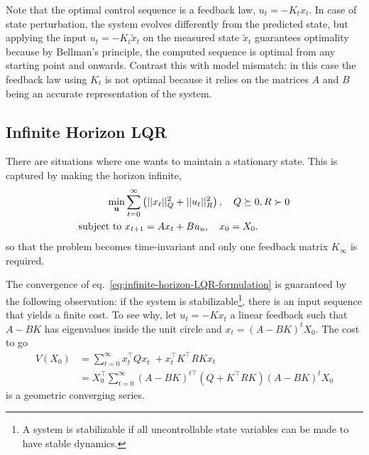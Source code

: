 Note that the optimal control sequence is a feedback law, $u_t=-K_tx_t$. In case of state perturbation, the system evolves differently from the predicted state, but applying the input $u_t=-K_t\tilde{x}_t$ on the measured state $\tilde{x}_t$ guarantees optimality because by Bellman's principle, the computed sequence is optimal from any starting point and onwards. Contrast this with model mismatch: in this case the feedback law using $K_t$ is not optimal because it relies on the matrices $A$ and $B$ being an accurate representation of the system.

\subsection{Infinite Horizon LQR}
\label{sec:infinite-horizon-LQR}

There are situations where one wants to maintain a stationary state. This is captured by making the horizon infinite,
\begin{equation}
  \label{eq:infinite-horizon-LQR-formulation}
  \begin{aligned}
\min_{\boldsymbol{\mathrm{u}}} &\sum_{t=0}^\infty \left(||x_t||_Q^2 + ||u_t||_R^2 \right),\quad Q\succeq 0, R\succ 0 \\
    \text{subject to } &x_{t+1} = Ax_t + Bu_u,\quad x_0=X_0.
  \end{aligned}
\end{equation}
so that the problem becomes time-invariant and only one feedback matrix $K_\infty$ is required.

The convergence of eq.~\eqref{eq:infinite-horizon-LQR-formulation} is guaranteed by the following observation: if the system is stabilizable\footnote{A system is stabilizable if all uncontrollable state variables can be made to have stable dynamics.}, there is an input sequence that yields a finite cost. To see why, let $u_t = -Kx_t$ a linear feedback such that $A-BK$ has eigenvalues inside the unit circle and $x_t=(A-BK)^tX_0$. The cost to go
\begin{align*}
  V(X_0) &= \sum_{t=0}^\infty x_t^\top Qx_t^{\phantom{\top}} + x_t^\top K^\top RKx_t \\
         &= X_0^\top \sum_{t=0}^\infty (A-BK)^{t\top}\left(Q+K^\top RK\right)(A-BK)^tX_0
\end{align*}
is a geometric converging series.

